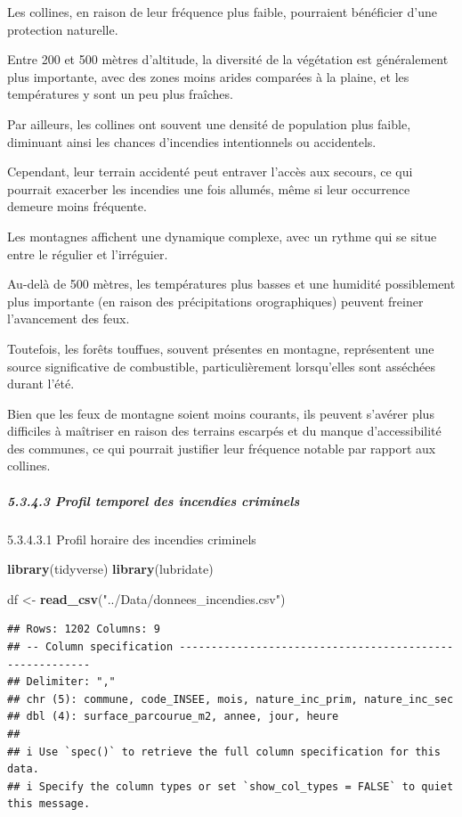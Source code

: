 \documentclass[
]{article}
\newenvironment{Shaded}{\begin{snugshade}}{\end{snugshade}}
\newcommand{\FunctionTok}[1]{\textcolor[rgb]{0.13,0.29,0.53}{\textbf{#1}}}
\newcommand{\NormalTok}[1]{#1}
\newcommand{\OtherTok}[1]{\textcolor[rgb]{0.56,0.35,0.01}{#1}}
\newcommand{\StringTok}[1]{\textcolor[rgb]{0.31,0.60,0.02}{#1}}
\begin{document}
Les collines, en raison de leur fréquence plus faible, pourraient
bénéficier d'une protection naturelle.

Entre 200 et 500 mètres d'altitude, la diversité de la végétation est
généralement plus importante, avec des zones moins arides comparées à la
plaine, et les températures y sont un peu plus fraîches.

Par ailleurs, les collines ont souvent une densité de population plus
faible, diminuant ainsi les chances d'incendies intentionnels ou
accidentels.

Cependant, leur terrain accidenté peut entraver l'accès aux secours, ce
qui pourrait exacerber les incendies une fois allumés, même si leur
occurrence demeure moins fréquente.

Les montagnes affichent une dynamique complexe, avec un rythme qui se
situe entre le régulier et l'irréguier.

Au-delà de 500 mètres, les températures plus basses et une humidité
possiblement plus importante (en raison des précipitations
orographiques) peuvent freiner l'avancement des feux.

Toutefois, les forêts touffues, souvent présentes en montagne,
représentent une source significative de combustible, particulièrement
lorsqu'elles sont asséchées durant l'été.

Bien que les feux de montagne soient moins courants, ils peuvent
s'avérer plus difficiles à maîtriser en raison des terrains escarpés et
du manque d'accessibilité des communes, ce qui pourrait justifier leur
fréquence notable par rapport aux collines.

\subparagraph{5.3.4.3 Profil temporel des incendies
criminels}\label{profil-temporel-des-incendies-criminels}

5.3.4.3.1 Profil horaire des incendies criminels

\begin{Shaded}
\begin{Highlighting}[]
\FunctionTok{library}\NormalTok{(tidyverse)}
\FunctionTok{library}\NormalTok{(lubridate)}

\NormalTok{df }\OtherTok{\textless{}{-}} \FunctionTok{read\_csv}\NormalTok{(}\StringTok{"../Data/donnees\_incendies.csv"}\NormalTok{)}
\end{Highlighting}
\end{Shaded}

\begin{verbatim}
## Rows: 1202 Columns: 9
## -- Column specification --------------------------------------------------------
## Delimiter: ","
## chr (5): commune, code_INSEE, mois, nature_inc_prim, nature_inc_sec
## dbl (4): surface_parcourue_m2, annee, jour, heure
## 
## i Use `spec()` to retrieve the full column specification for this data.
## i Specify the column types or set `show_col_types = FALSE` to quiet this message.
\end{verbatim}
\end{document}
